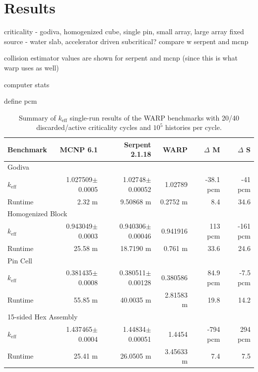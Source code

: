 \chapter{Results}
\label{chap:results}


criticality - godiva, homogenized cube, single pin,  small array, large array
fixed source - water slab, accelerator driven subcritical?
compare w serpent and mcnp

collision estimator values are shown for serpent and mcnp (since this is what warp uses as well)

computer stats

define pcm

\begin{table}[h]
\centering
\caption{Summary of $k_\mathrm{eff}$ single-run results of the WARP benchmarks with 20/40 discarded/active criticality cycles and $10^5$ histories per cycle.}
\label{benchmark_summary}
\begin{tabular}{| l | r | r | r | r | r |}
 \hline
 Benchmark & MCNP 6.1 & Serpent 2.1.18 & WARP & $\Delta$ M & $\Delta$ S  \\
\hline
\hline
\multicolumn{6}{|l|}{Godiva}  \\
\hline
 $k_\mathrm{eff}$ & 1.027509$\pm$0.0005 & 1.02748$\pm$0.00052 & 1.02789 & -38.1 pcm & -41 pcm  \\
 \hline
 Runtime               & 2.32 m & 9.50868 m & 0.2752 m & 8.4  & 34.6  \\
 \hline
 \hline
\multicolumn{6}{|l|}{Homogenized Block }\\
\hline
 $k_\mathrm{eff}$ & 0.943049$\pm$0.0003 & 0.940306$\pm$0.00046 & 0.941916 & 113 pcm & -161 pcm   \\
 \hline
 Runtime               &  25.58 m & 18.7190 m & 0.761 m & 33.6  & 24.6  \\
 \hline
  \hline
\multicolumn{6}{|l|}{Pin Cell}\\
\hline
 $k_\mathrm{eff}$ & 0.381435$\pm$0.0008 &  0.380511$\pm$0.00128 & 0.380586 & 84.9 pcm &  -7.5 pcm    \\
 \hline
 Runtime               & 55.85 m & 40.0035 m &  2.81583 m &  19.8 & 14.2  \\
 \hline
  \hline
\multicolumn{6}{|l|}{15-sided Hex Assembly}\\
\hline
 $k_\mathrm{eff}$ & 1.437465$\pm$0.0004 & 1.44834$\pm$0.00051 & 1.4454 & -794 pcm & 294 pcm  \\
 \hline
 Runtime               & 25.41 m &  26.0505 m &  3.45633 m  & 7.4 & 7.5  \\
 \hline
\end{tabular}
\end{table}


